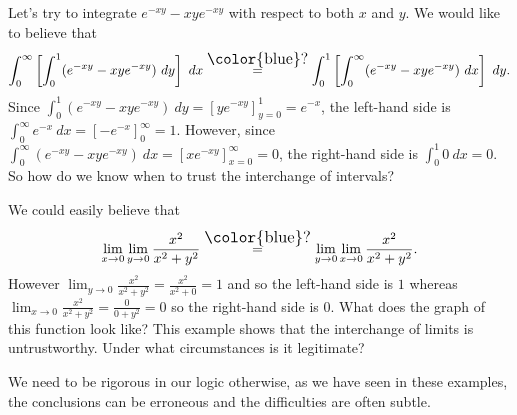 \begin{example*}
  Let's try to integrate \(e^{-xy} - xye^{-xy}\) with respect to both \(x\) and \(y\).
  We would like to believe that
  \[
    \int_{0}^{\infty} \left[ \int_{0}^{1} (e^{-xy} - xye^{-xy}) \ dy \right] \ dx
    \overset{\text{\large\color{blue}?}}{=} \int_{0}^{1} \left[ \int_{0}^{\infty}  (e^{-xy} - xye^{-xy}) \ dx \right] \ dy.
  \]
  Since
  \( \int_{0}^{1} (e^{-xy} - xye^{-xy}) \ dy = {\left[ye^{-xy}\right]}_{y=0}^{1} = e^{-x}\),
  the left-hand side is
  \( \int_{0}^{\infty} e^{-x} \ dx = {\left[ -e^{-x} \right]}_{0}^{\infty} = 1 \).
  However, since
  \( \int_{0}^{\infty}  (e^{-xy} - xye^{-xy}) \ dx = {\left[ xe^{-xy} \right]}_{x=0}^{\infty} = 0\),
  the right-hand side is \(\int_{0}^{1} 0 \ dx = 0\).
  So how do we know when to trust the interchange of intervals?
\end{example*}


\begin{example*}
  We could easily believe that
  \[
    \lim_{x\to 0}\lim_{y\to 0} \frac{x^2}{x^2 + y^2}
    \overset{\text{\large\color{blue}?}}{=}
    \lim_{y\to 0}\lim_{x\to 0} \frac{x^2}{x^2 + y^2}.
  \]
  However \(\lim_{y\to 0} \frac{x^2}{x^2 + y^2} = \frac{x^2}{x^2 + 0} = 1 \) and so the left-hand side is \(1\)
  whereas \(\lim_{x\to 0} \frac{x^2}{x^2 + y^2} = \frac{0}{0 + y^2} = 0\) so the right-hand side is \(0\).
  What does the graph of this function look like?
  This example shows that the interchange of limits is untrustworthy. Under what circumstances is it legitimate?
\end{example*}

We need to be rigorous in our logic otherwise, as we have seen in these examples, the conclusions can be erroneous and the difficulties are often subtle.

